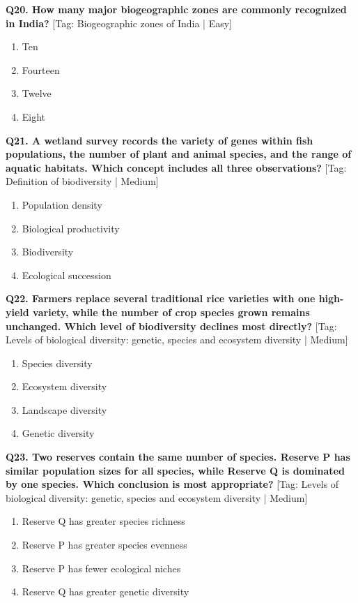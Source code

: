 \noindent\textbf{Q20. How many major biogeographic zones are commonly recognized in India?} \hfill [Tag: Biogeographic zones of India | Easy]
\begin{enumerate}[label=(\alph*),topsep=2pt,itemsep=1pt,partopsep=0pt,parsep=0pt]
    \item {Ten}
    \item {Fourteen}
    \item {Twelve}
    \item {Eight}
\end{enumerate}
\vspace{2mm}

\noindent\textbf{Q21. A wetland survey records the variety of genes within fish populations, the number of plant and animal species, and the range of aquatic habitats. Which concept includes all three observations?} \hfill [Tag: Definition of biodiversity | Medium]
\begin{enumerate}[label=(\alph*),topsep=2pt,itemsep=1pt,partopsep=0pt,parsep=0pt]
    \item {Population density}
    \item {Biological productivity}
    \item {Biodiversity}
    \item {Ecological succession}
\end{enumerate}
\vspace{2mm}

\noindent\textbf{Q22. Farmers replace several traditional rice varieties with one high-yield variety, while the number of crop species grown remains unchanged. Which level of biodiversity declines most directly?} \hfill [Tag: Levels of biological diversity: genetic, species and ecosystem diversity | Medium]
\begin{enumerate}[label=(\alph*),topsep=2pt,itemsep=1pt,partopsep=0pt,parsep=0pt]
    \item {Species diversity}
    \item {Ecosystem diversity}
    \item {Landscape diversity}
    \item {Genetic diversity}
\end{enumerate}
\vspace{2mm}

\noindent\textbf{Q23. Two reserves contain the same number of species. Reserve P has similar population sizes for all species, while Reserve Q is dominated by one species. Which conclusion is most appropriate?} \hfill [Tag: Levels of biological diversity: genetic, species and ecosystem diversity | Medium]
\begin{enumerate}[label=(\alph*),topsep=2pt,itemsep=1pt,partopsep=0pt,parsep=0pt]
    \item {Reserve Q has greater species richness}
    \item {Reserve P has greater species evenness}
    \item {Reserve P has fewer ecological niches}
    \item {Reserve Q has greater genetic diversity}
\end{enumerate}
\vspace{2mm}

